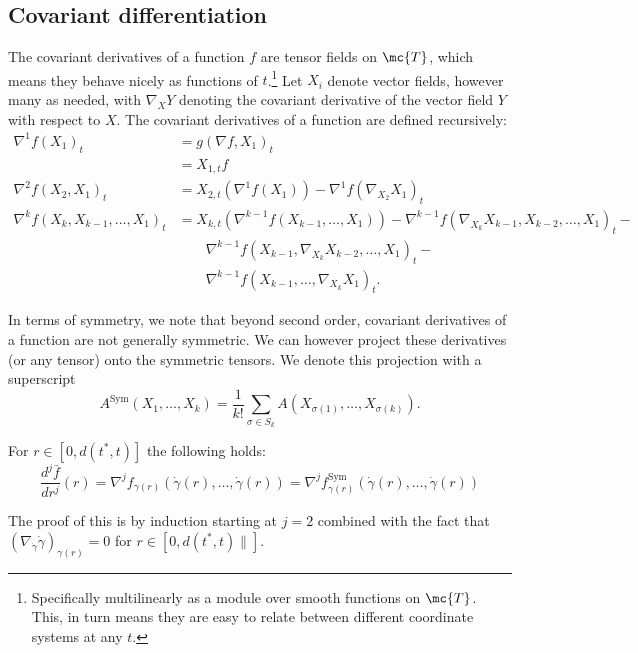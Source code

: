 \documentclass{article}
\begin{document}
\subsection{Covariant differentiation}

The covariant derivatives of a function $f$ are tensor fields on $\mc{T}$, which means they behave nicely
as functions of $t$.\footnote{Specifically multilinearly as a module over smooth functions on $\mc{T}$. This,
in turn means they are easy to relate between different coordinate systems at any $t$.}
Let $X_i$ denote vector fields, however many as needed, with $\nabla_XY$ denoting
the covariant derivative of the vector field $Y$ with respect to $X$. The covariant
derivatives of a function are defined recursively:
$$
\begin{aligned}
  \nabla^1 f(X_1)_t &= g(\nabla f, X_1)_t \\
  &= X_{1,t}f \\
  \nabla^2 f(X_2, X_1)_t &= X_{2,t}(\nabla^1 f(X_1)) - \nabla^1 f(\nabla_{X_2}X_1)_t \\
  \nabla^k f(X_k, X_{k-1}, \dots, X_1)_t &= X_{k,t}(\nabla^{k-1} f(X_{k-1}, \dots, X_1)) -
  \nabla^{k-1} f(\nabla_{X_k}X_{k-1}, X_{k-2}, \dots, X_1)_t - \\
&  \qquad   \nabla^{k-1} f(X_{k-1}, \nabla_{X_k}X_{k-2}, \dots, X_1)_t - \\
  & \qquad \nabla^{k-1} f(X_{k-1}, \dots, \nabla_{X_k}X_1)_t.
  \end{aligned}
$$

In terms of symmetry, we note that beyond second order, covariant derivatives of a function are not generally symmetric. We can however project these derivatives
(or any tensor) 
onto the symmetric tensors. We denote this projection with a superscript
$$
A^{\mathrm{Sym}}(X_1, \dots, X_k) = \frac{1}{k!} \sum_{\sigma \in S_k} A(X_{\sigma(1)}, \dots, X_{\sigma(k)}).
$$

\begin{lemma}
\label{lem:geodesic}
  For $r \in [0, d(t^*,t)]$ the following holds:
  $$
\frac{d^j\bar{f}}{dr^j}(r) = \nabla^j f_{\gamma(r)}(\dot{\gamma}(r), \dots, \dot{\gamma}(r)) =  \nabla^j f_{\gamma(r)}^{\mathrm{Sym}}(\dot{\gamma}(r), \dots, \dot{\gamma}(r))
  $$
  \end{lemma}
The proof of this is by induction starting at $j=2$ combined with the fact that $(\nabla_{\dot{\gamma}}\dot{\gamma})_{\gamma(r)}=0$ for $r \in [0, d(t^*,t)\|]$.
\end{document}
